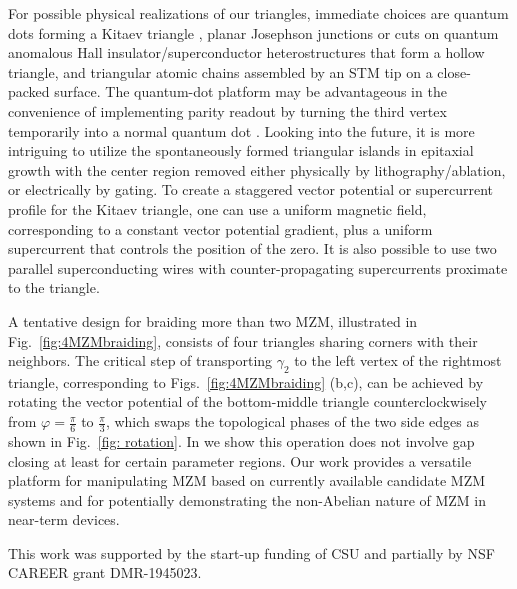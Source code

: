 \documentclass[aps,prb,twocolumn,showpacs,amsmath,amssymb,superscriptaddress]{revtex4-2}
\begin{document}
For possible physical realizations of our triangles, immediate choices are quantum dots forming a Kitaev triangle \cite{dvirRealizationMinimalKitaev2023}, planar Josephson junctions or cuts on quantum anomalous Hall insulator/superconductor heterostructures \cite{xieCreatingLocalizedMajorana2021} that form a hollow triangle, and triangular atomic chains assembled by an STM tip \cite{schneiderPrecursorsMajoranaModes2022} on a close-packed surface. The quantum-dot platform may be advantageous in the convenience of implementing parity readout by turning the third vertex temporarily into a normal quantum dot \cite{mishmashDephasingLeakageDynamics2020,parity_QD_readout_2020, fengProbingRobustMajorana2022}. Looking into the future, it is more intriguing to utilize the spontaneously formed triangular islands in epitaxial growth \cite{pietzschSpinResolvedElectronicStructure2006} with the center region removed either physically by lithography/ablation, or electrically by gating. To create a staggered vector potential or supercurrent profile for the Kitaev triangle, one can use a uniform magnetic field, corresponding to a constant vector potential gradient, plus a uniform supercurrent that controls the position of the zero. It is also possible to use two parallel superconducting wires with counter-propagating supercurrents proximate to the triangle.

A tentative design for braiding more than two MZM, illustrated in Fig.~\ref{fig:4MZMbraiding}, consists of four triangles sharing corners with their neighbors. The critical step of transporting $\gamma_2$ to the left vertex of the rightmost triangle, corresponding to Figs.~\ref{fig:4MZMbraiding} (b,c), can be achieved by rotating the vector potential of the bottom-middle triangle counterclockwisely from $\varphi = \frac{\pi}{6}$ to $\frac{\pi}{3}$, which swaps the topological phases of the two side edges as shown in Fig.~\ref{fig: rotation}. In \cite{supp} we show this operation does not involve gap closing at least for certain parameter regions. Our work provides a versatile platform for manipulating MZM based on currently available candidate MZM systems and for potentially demonstrating the non-Abelian nature of MZM in near-term devices.

\begin{acknowledgements}
This work was supported by the start-up funding of CSU and partially by NSF CAREER grant DMR-1945023.
\end{acknowledgements}



\end{document}
